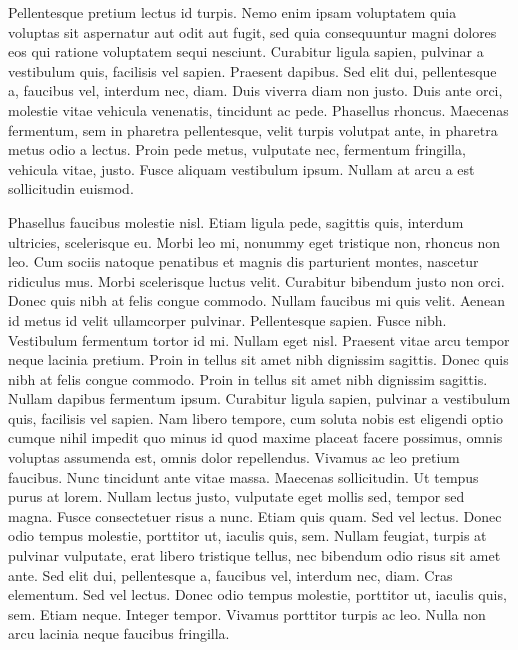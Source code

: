Pellentesque pretium lectus id turpis. 
Nemo enim ipsam voluptatem quia voluptas sit aspernatur aut odit aut fugit, sed quia consequuntur magni dolores eos qui ratione voluptatem sequi nesciunt. 
Curabitur ligula sapien, pulvinar a vestibulum quis, facilisis vel sapien. 
Praesent dapibus. 
Sed elit dui, pellentesque a, faucibus vel, interdum nec, diam. 
Duis viverra diam non justo. 
Duis ante orci, molestie vitae vehicula venenatis, tincidunt ac pede. 
Phasellus rhoncus. 
Maecenas fermentum, sem in pharetra pellentesque, velit turpis volutpat ante, in pharetra metus odio a lectus. 
Proin pede metus, vulputate nec, fermentum fringilla, vehicula vitae, justo. 
Fusce aliquam vestibulum ipsum. 
Nullam at arcu a est sollicitudin euismod.

Phasellus faucibus molestie nisl. 
Etiam ligula pede, sagittis quis, interdum ultricies, scelerisque eu. 
Morbi leo mi, nonummy eget tristique non, rhoncus non leo. 
Cum sociis natoque penatibus et magnis dis parturient montes, nascetur ridiculus mus. 
Morbi scelerisque luctus velit. 
Curabitur bibendum justo non orci. 
Donec quis nibh at felis congue commodo. 
Nullam faucibus mi quis velit. 
Aenean id metus id velit ullamcorper pulvinar. 
Pellentesque sapien. 
Fusce nibh. 
Vestibulum fermentum tortor id mi. 
Nullam eget nisl. 
Praesent vitae arcu tempor neque lacinia pretium. 
Proin in tellus sit amet nibh dignissim sagittis. 
Donec quis nibh at felis congue commodo.
%
Proin in tellus sit amet nibh dignissim sagittis. 
Nullam dapibus fermentum ipsum. 
Curabitur ligula sapien, pulvinar a vestibulum quis, facilisis vel sapien. 
Nam libero tempore, cum soluta nobis est eligendi optio cumque nihil impedit quo minus id quod maxime placeat facere possimus, omnis voluptas assumenda est, omnis dolor repellendus. 
Vivamus ac leo pretium faucibus. 
Nunc tincidunt ante vitae massa. 
Maecenas sollicitudin. 
Ut tempus purus at lorem. 
Nullam lectus justo, vulputate eget mollis sed, tempor sed magna. 
Fusce consectetuer risus a nunc. 
Etiam quis quam.
%
Sed vel lectus. 
Donec odio tempus molestie, porttitor ut, iaculis quis, sem. 
Nullam feugiat, turpis at pulvinar vulputate, erat libero tristique tellus, nec bibendum odio risus sit amet ante. 
Sed elit dui, pellentesque a, faucibus vel, interdum nec, diam. 
Cras elementum. 
Sed vel lectus. 
Donec odio tempus molestie, porttitor ut, iaculis quis, sem. 
Etiam neque. 
Integer tempor. 
Vivamus porttitor turpis ac leo. 
Nulla non arcu lacinia neque faucibus fringilla.
%
